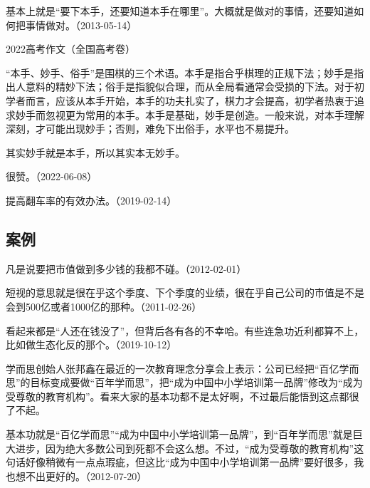 
基本上就是“要下本手，还要知道本手在哪里”。大概就是做对的事情，还要知道如何把事情做对。（2013-05-14）


2022高考作文（全国高考卷）

“本手、妙手、俗手”是围棋的三个术语。本手是指合乎棋理的正规下法；妙手是指出人意料的精妙下法；俗手是指貌似合理，而从全局看通常会受损的下法。对于初学者而言，应该从本手开始，本手的功夫扎实了，棋力才会提高，初学者热衷于追求妙手而忽视更为常用的本手。本手是基础，妙手是创造。一般来说，对本手理解深刻，才可能出现妙手；否则，难免下出俗手，水平也不易提升。

其实妙手就是本手，所以其实本无妙手。


很赞。（2022-06-08）


提高翻车率的有效办法。（2019-02-14）

\subsection{案例}


凡是说要把市值做到多少钱的我都不碰。（2012-02-01）

短视的意思就是很在乎这个季度、下个季度的业绩，很在乎自己公司的市值是不是会到500亿或者1000亿的那种。（2011-02-26）


看起来都是“人还在钱没了”，但背后各有各的不幸哈。有些连急功近利都算不上，比如做生态化反的那个。（2019-10-12）

学而思创始人张邦鑫在最近的一次教育理念分享会上表示：公司已经把“百亿学而思”的目标变成要做“百年学而思”，把“成为中国中小学培训第一品牌”修改为“成为受尊敬的教育机构”。看来大家的基本功都不是太好啊，不过最后能悟到这点都很了不起。


基本功就是“百亿学而思”“成为中国中小学培训第一品牌”，到“百年学而思”就是巨大进步，因为绝大多数公司到死都不会这么想。不过，“成为受尊敬的教育机构”这句话好像稍微有一点点瑕疵，但这比“成为中国中小学培训第一品牌”要好很多，我也想不出更好的。（2012-07-20）
